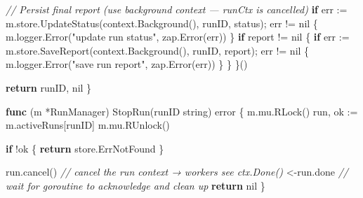 \documentclass[
]{article}
\newenvironment{Shaded}{}{}
\newcommand{\CommentTok}[1]{\textcolor[rgb]{0.38,0.63,0.69}{\textit{#1}}}
\newcommand{\ControlFlowTok}[1]{\textcolor[rgb]{0.00,0.44,0.13}{\textbf{#1}}}
\newcommand{\DataTypeTok}[1]{\textcolor[rgb]{0.56,0.13,0.00}{#1}}
\newcommand{\KeywordTok}[1]{\textcolor[rgb]{0.00,0.44,0.13}{\textbf{#1}}}
\newcommand{\NormalTok}[1]{#1}
\newcommand{\OperatorTok}[1]{\textcolor[rgb]{0.40,0.40,0.40}{#1}}
\newcommand{\OtherTok}[1]{\textcolor[rgb]{0.00,0.44,0.13}{#1}}
\newcommand{\StringTok}[1]{\textcolor[rgb]{0.25,0.44,0.63}{#1}}
\begin{document}
\begin{Shaded}
\begin{Highlighting}[]
        \CommentTok{// Persist final report (use background context — runCtx is cancelled)}
        \ControlFlowTok{if}\NormalTok{ err }\OperatorTok{:=}\NormalTok{ m}\OperatorTok{.}\NormalTok{store}\OperatorTok{.}\NormalTok{UpdateStatus}\OperatorTok{(}\NormalTok{context}\OperatorTok{.}\NormalTok{Background}\OperatorTok{(),}\NormalTok{ runID}\OperatorTok{,}\NormalTok{ status}\OperatorTok{);}\NormalTok{ err }\OperatorTok{!=} \OtherTok{nil} \OperatorTok{\{}
\NormalTok{            m}\OperatorTok{.}\NormalTok{logger}\OperatorTok{.}\NormalTok{Error}\OperatorTok{(}\StringTok{"update run status"}\OperatorTok{,}\NormalTok{ zap}\OperatorTok{.}\NormalTok{Error}\OperatorTok{(}\NormalTok{err}\OperatorTok{))}
        \OperatorTok{\}}
        \ControlFlowTok{if}\NormalTok{ report }\OperatorTok{!=} \OtherTok{nil} \OperatorTok{\{}
            \ControlFlowTok{if}\NormalTok{ err }\OperatorTok{:=}\NormalTok{ m}\OperatorTok{.}\NormalTok{store}\OperatorTok{.}\NormalTok{SaveReport}\OperatorTok{(}\NormalTok{context}\OperatorTok{.}\NormalTok{Background}\OperatorTok{(),}\NormalTok{ runID}\OperatorTok{,}\NormalTok{ report}\OperatorTok{);}\NormalTok{ err }\OperatorTok{!=} \OtherTok{nil} \OperatorTok{\{}
\NormalTok{                m}\OperatorTok{.}\NormalTok{logger}\OperatorTok{.}\NormalTok{Error}\OperatorTok{(}\StringTok{"save run report"}\OperatorTok{,}\NormalTok{ zap}\OperatorTok{.}\NormalTok{Error}\OperatorTok{(}\NormalTok{err}\OperatorTok{))}
            \OperatorTok{\}}
        \OperatorTok{\}}
    \OperatorTok{\}()}

    \ControlFlowTok{return}\NormalTok{ runID}\OperatorTok{,} \OtherTok{nil}
\OperatorTok{\}}

\KeywordTok{func} \OperatorTok{(}\NormalTok{m }\OperatorTok{*}\NormalTok{RunManager}\OperatorTok{)}\NormalTok{ StopRun}\OperatorTok{(}\NormalTok{runID }\DataTypeTok{string}\OperatorTok{)} \DataTypeTok{error} \OperatorTok{\{}
\NormalTok{    m}\OperatorTok{.}\NormalTok{mu}\OperatorTok{.}\NormalTok{RLock}\OperatorTok{()}
\NormalTok{    run}\OperatorTok{,}\NormalTok{ ok }\OperatorTok{:=}\NormalTok{ m}\OperatorTok{.}\NormalTok{activeRuns}\OperatorTok{[}\NormalTok{runID}\OperatorTok{]}
\NormalTok{    m}\OperatorTok{.}\NormalTok{mu}\OperatorTok{.}\NormalTok{RUnlock}\OperatorTok{()}

    \ControlFlowTok{if} \OperatorTok{!}\NormalTok{ok }\OperatorTok{\{}
        \ControlFlowTok{return}\NormalTok{ store}\OperatorTok{.}\NormalTok{ErrNotFound}
    \OperatorTok{\}}

\NormalTok{    run}\OperatorTok{.}\NormalTok{cancel}\OperatorTok{()} \CommentTok{// cancel the run context → workers see ctx.Done()}
    \OperatorTok{\textless{}{-}}\NormalTok{run}\OperatorTok{.}\NormalTok{done   }\CommentTok{// wait for goroutine to acknowledge and clean up}
    \ControlFlowTok{return} \OtherTok{nil}
\OperatorTok{\}}


\end{Highlighting}
\end{Shaded}
\end{document}
